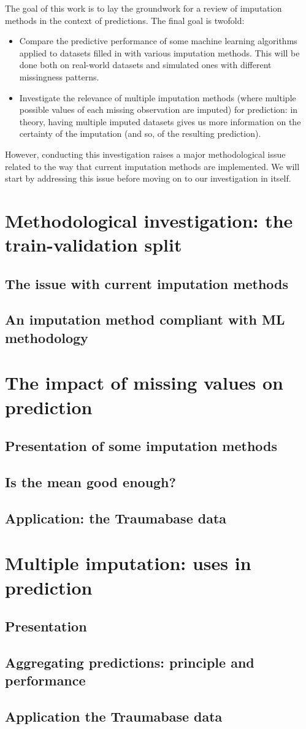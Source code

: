 \documentclass[12pt, a4paper]{article}
\begin{document}
The goal of this work is to lay the groundwork for a review of imputation methods in the context of predictions. The final goal is twofold:
\begin{itemize}
\item Compare the predictive performance of some machine learning algorithms applied to datasets filled in with various imputation methods. This will be done both on real-world datasets and simulated ones with different missingness patterns.
\item Investigate the relevance of multiple imputation methods (where multiple possible values of each missing observation are imputed) for prediction: in theory, having multiple imputed datasets gives us more information on the certainty of the imputation (and so, of the resulting prediction).
\end{itemize}

However, conducting this investigation raises a major methodological issue related to the way that current imputation methods are implemented. We will start by addressing this issue before moving on to our investigation in itself. 

\section{Methodological investigation: the train-validation split}
\subsection{The issue with current imputation methods}

\subsection{An imputation method compliant with ML methodology}

\section{The impact of missing values on prediction}
\subsection{Presentation of some imputation methods}
\subsection{Is the mean good enough?}
\subsection{Application: the Traumabase data}

\section{Multiple imputation: uses in prediction}
\subsection{Presentation}
\subsection{Aggregating predictions: principle and performance}
\subsection{Application the Traumabase data}
\end{document}
